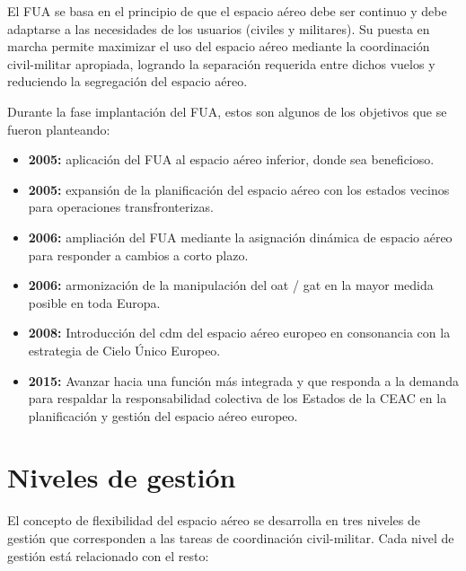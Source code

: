 El FUA se basa en el principio de que el espacio aéreo debe ser continuo y debe adaptarse a las necesidades de los usuarios (civiles y militares). Su puesta en marcha permite maximizar el uso del espacio aéreo mediante la coordinación civil-militar apropiada, logrando la separación requerida entre dichos vuelos y reduciendo la segregación del espacio aéreo.

Durante la fase implantación del FUA, estos son algunos de los objetivos que se fueron planteando:

\begin{itemize}
    \item \textbf{2005:} aplicación del FUA al espacio aéreo inferior, donde sea beneficioso.
    \item \textbf{2005:} expansión de la planificación del espacio aéreo con los estados vecinos para operaciones transfronterizas.
    \item \textbf{2006:} ampliación del FUA mediante la asignación dinámica de espacio aéreo para responder a cambios a corto plazo.
    \item \textbf{2006:} armonización de la manipulación del \acrfull{oat} / \acrfull{gat} en la mayor medida posible en toda Europa.
    \item \textbf{2008:} Introducción del \acrfull{cdm} del espacio aéreo europeo en consonancia con la estrategia de Cielo Único Europeo.
    \item \textbf{2015:} Avanzar hacia una función más integrada y que responda a la demanda para respaldar la responsabilidad colectiva de los Estados de la CEAC en la planificación y gestión del espacio aéreo europeo.
\end{itemize}

\section{Niveles de gestión}

El concepto de flexibilidad del espacio aéreo se desarrolla en tres niveles de gestión que corresponden a las tareas de coordinación civil-militar. Cada nivel de gestión está relacionado con el resto:

